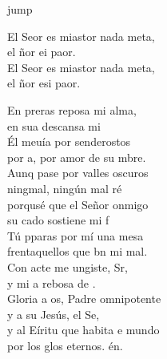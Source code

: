 \begin{cancion}jump\\
	\begin{chorus}%
		El Seor es miastor nada meta,\\
		el ñor ei paor.\\
		El Seor es miastor nada meta,\\
		el ñor esi paor.\jump\\
	\end{chorus}%
	En preras reposa mi alma,\\
	en sua descansa mi  \\
	Él meuía por senderostos\\
	por a, por amor de su mbre.\\
	Aunq pase por valles oscuros\\
	ningmal, ningún mal ré\\
	porqusé que el Señor onmigo\\
	su cado sostiene mi f \\
	\jump
	Tú pparas por mí una mesa\\
	frentaquellos que bn mi mal.\\
	Con acte me ungiste, Sr,\\
	y mi a rebosa de .\\
	Gloria a os, Padre omnipotente\\
	y a su  Jesús, el Se,\\
	y al Eíritu que habita e mundo\\
	por los glos eternos. én.\\
\end{cancion}%
